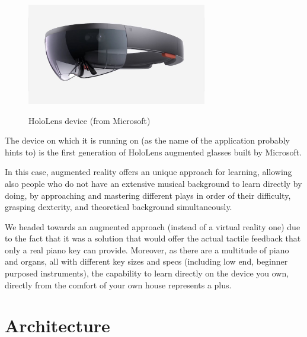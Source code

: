 \documentclass[12 pct]{report}
\begin{document}
\begin{figure}[H]
\includegraphics[width=0.7\textwidth]{hololens}
\centering
\label{fig:hololens}
\caption{HoloLens device (from Microsoft)}
\end{figure}



The device on which it is running on (as the name of the application probably hints to) is the first generation of HoloLens augmented glasses built by Microsoft.


In this case, augmented reality offers an unique approach for learning, allowing also people who do not have an extensive musical background to learn directly by doing, by approaching and mastering different plays in order of their difficulty, grasping dexterity, and theoretical background simultaneously.

We headed towards an augmented approach (instead of a virtual reality one) due to the fact that it was a solution that would offer the actual tactile feedback that only a real piano key can provide. Moreover, as there are a multitude of piano and organs, all with different key sizes and specs (including low end, beginner purposed instruments), the capability to learn directly on the device you own, directly from the comfort of your own house represents a plus.

\section{Architecture}
\end{document}
